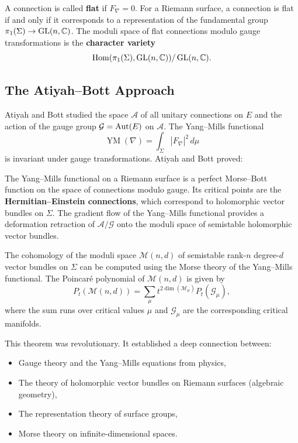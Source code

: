 A connection is called \textbf{flat} if \(F_\nabla = 0\). For a Riemann surface, a connection is flat if and only if it corresponds to a representation of the fundamental group \(\pi_1(\Sigma) \to \operatorname{GL}(n, \mathbb{C})\). The moduli space of flat connections modulo gauge transformations is the \textbf{character variety}
\[
\operatorname{Hom}(\pi_1(\Sigma), \operatorname{GL}(n, \mathbb{C})) / \operatorname{GL}(n, \mathbb{C}).
\]

\subsection{The Atiyah--Bott Approach}

Atiyah and Bott studied the space \(\mathcal{A}\) of all unitary connections on \(E\) and the action of the gauge group \(\mathcal{G} = \operatorname{Aut}(E)\) on \(\mathcal{A}\). The Yang--Mills functional
\[
\operatorname{YM}(\nabla) = \int_\Sigma |F_\nabla|^2 \, d\mu
\]
is invariant under gauge transformations. Atiyah and Bott proved:

\begin{theorem}
The Yang--Mills functional on a Riemann surface is a perfect Morse--Bott function on the space of connections modulo gauge. Its critical points are the \textbf{Hermitian--Einstein connections}, which correspond to holomorphic vector bundles on \(\Sigma\). The gradient flow of the Yang--Mills functional provides a deformation retraction of \(\mathcal{A}/\mathcal{G}\) onto the moduli space of semistable holomorphic vector bundles.

The cohomology of the moduli space \(\mathcal{M}(n,d)\) of semistable rank-\(n\) degree-\(d\) vector bundles on \(\Sigma\) can be computed using the Morse theory of the Yang--Mills functional. The Poincar\'e polynomial of \(\mathcal{M}(n,d)\) is given by
\[
P_t(\mathcal{M}(n,d)) = \sum_{\mu} t^{2 \dim(\mathcal{M}_\mu)} P_t(\mathcal{G}_\mu),
\]
where the sum runs over critical values \(\mu\) and \(\mathcal{G}_\mu\) are the corresponding critical manifolds.
\end{theorem}

This theorem was revolutionary. It established a deep connection between:
\begin{itemize}
\item Gauge theory and the Yang--Mills equations from physics,
\item The theory of holomorphic vector bundles on Riemann surfaces (algebraic geometry),
\item The representation theory of surface groups,
\item Morse theory on infinite-dimensional spaces.
\end{itemize}

